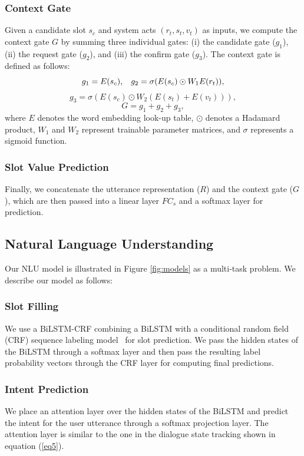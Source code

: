 \documentclass[letterpaper]{article} %
\begin{document}
\subsubsection{Context Gate}
Given a candidate slot $s_c$ and system acts $(r_t, s_t, v_t)$ as inputs, we compute the context gate $G$ by summing three individual gates: (i) the candidate gate ($g_1$), (ii) the request gate ($g_2$), and (iii) the confirm gate ($g_3$). The context gate is defined as follows:
\begin{equation}
    g_1 = E(s_c), \hspace{3mm} g_2 = \sigma(E(s_c) \odot W_1 E(r_t)),
\end{equation}
\begin{equation}
    g_3 = \sigma(E(s_c) \odot W_2 (E(s_t)+E(v_t))),
\end{equation}
\begin{equation}
    G = g_1 + g_2 + g_3,
\end{equation}
where $E$ denotes the word embedding look-up table, $\odot$ denotes a Hadamard product, $W_1$ and $W_2$ represent trainable parameter matrices, and $\sigma$ represents a sigmoid function.

\subsubsection{Slot Value Prediction}
Finally, we concatenate the utterance representation ($R$) and the context gate ($G$), which are then passed into a linear layer $FC_s$ and a softmax layer for prediction.

\subsection{Natural Language Understanding}
Our NLU model is illustrated in Figure \ref{fig:models} as a multi-task problem. We describe our model as follows:

\subsubsection{Slot Filling} 
We use a BiLSTM-CRF combining a BiLSTM with a conditional random field (CRF) sequence labeling model~\cite{lample2016neural} for slot prediction. We pass the hidden states of the BiLSTM through a softmax layer and then pass the resulting label probability vectors through the CRF layer for computing final predictions. 

\subsubsection{Intent Prediction} 
We place an attention layer over the hidden states of the BiLSTM and predict the intent for the user utterance through a softmax projection layer. The attention layer is similar to the one in the dialogue state tracking shown in equation (\ref{eq5}). 
\end{document}
